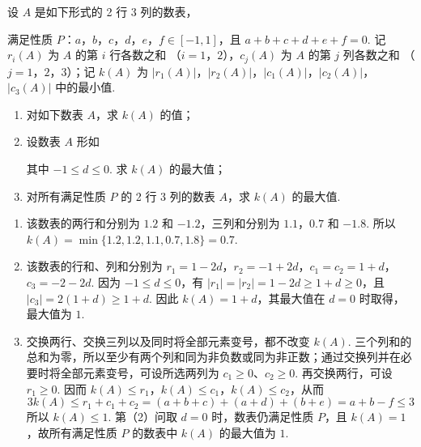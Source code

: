 \begin{problem}
设 \(A\) 是如下形式的 2 行 3 列的数表，


满足性质 \(P\)：\(a\)，\(b\)，\(c\)，\(d\)，\(e\)，\(f \in [-1, 1]\)，且 \(a + b + c + d + e + f = 0\).
记 \(r_i(A)\) 为 \(A\) 的第 \(i\) 行各数之和 （\(i = 1\)，\(2\)），\(c_j(A)\) 为 \(A\) 的第 \(j\) 列各数之和 （\(j = 1\)，\(2\)，\(3\)）；记 \(k(A)\) 为 \(|r_1(A)|\)，\(|r_2(A)|\)，\(|c_1(A)|\)，\(|c_2(A)|\)，\(|c_3(A)|\) 中的最小值.

\begin{enumerate}
\item 对如下数表 \(A\)，求 \(k(A)\) 的值；


\item 设数表 \(A\) 形如


其中 \(-1 \leqslant d \leqslant 0\). 求 \(k(A)\) 的最大值；
\item 对所有满足性质 \(P\) 的 2 行 3 列的数表 \(A\)，求 \(k(A)\) 的最大值.
\end{enumerate}
\begin{solution}
\begin{enumerate}
\item 该数表的两行和分别为 \(1.2\) 和 \(-1.2\)，三列和分别为 \(1.1\)，\(0.7\) 和 \(-1.8\). 所以
\(k(A)=\min\{1.2,1.2,1.1,0.7,1.8\}=0.7\).

\item 该数表的行和、列和分别为
\(r_1=1-2d\)，\(r_2=-1+2d\)，\(c_1=c_2=1+d\)，\(c_3=-2-2d\). 因为 \(-1\leqslant d\leqslant0\)，有
\(|r_1|=|r_2|=1-2d\geqslant1+d\geqslant0\)，且 \(|c_3|=2(1+d)\geqslant1+d\). 因此 \(k(A)=1+d\)，其最大值在 \(d=0\) 时取得，最大值为 \(1\).

\item 交换两行、交换三列以及同时将全部元素变号，都不改变 \(k(A)\). 三个列和的总和为零，所以至少有两个列和同为非负数或同为非正数；通过交换列并在必要时将全部元素变号，可设所选两列为 \(c_1\geqslant0\)、\(c_2\geqslant0\). 再交换两行，可设 \(r_1\geqslant0\). 因而
\(k(A)\leqslant r_1\)，\(k(A)\leqslant c_1\)，\(k(A)\leqslant c_2\)，从而
\[
3k(A)\leqslant r_1+c_1+c_2
=(a+b+c)+(a+d)+(b+e)
=a+b-f\leqslant3
\]
所以 \(k(A)\leqslant1\). 第（2）问取 \(d=0\) 时，数表仍满足性质 \(P\)，且 \(k(A)=1\)，故所有满足性质 \(P\) 的数表中 \(k(A)\) 的最大值为 \(1\).
\end{enumerate}
\end{solution}
\end{problem}
